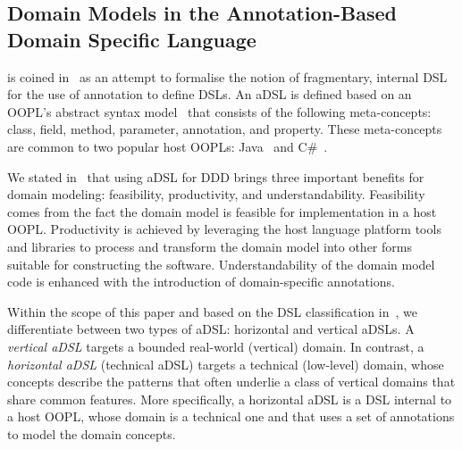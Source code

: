 \subsection{Domain Models in the Annotation-Based Domain Specific Language \dcsl}
\label{sect:bg-dcsl}

 is coined in~\cite{nosal_language_2016} as an attempt to formalise the notion of fragmentary, internal DSL~\cite{fowler_domain-specific_2010} for the use of annotation to define DSLs. An aDSL is defined based on an OOPL's abstract syntax model~\cite{le_domain_2018} that consists of the following meta-concepts: class, field, method, parameter, annotation, and property. These meta-concepts are common to two popular host OOPLs: Java~\cite{gosling_java_2014} and C\#~\cite{hejlsberg_c_2010}.

%
We stated in~\cite{le_domain_2018} that using aDSL for DDD brings three important benefits for domain modeling: feasibility, productivity, and understandability. Feasibility comes from the fact the domain model is feasible for implementation in a host OOPL. Productivity is achieved by leveraging the host language platform tools and libraries to process and transform the domain model into other forms suitable for constructing the software. Understandability of the domain model code is enhanced with the introduction of domain-specific annotations.

Within the scope of this paper and based on the DSL classification in~\cite{kleppe_software_2008}, we differentiate between two types of aDSL: horizontal and vertical aDSLs.
A \textit{vertical aDSL} targets a bounded real-world (vertical) domain. In contrast, a \textit{horizontal aDSL} (\aka technical aDSL) targets a technical (low-level) domain, whose concepts describe the patterns that often underlie a class of vertical domains that share common features. 
More specifically, a horizontal aDSL is a DSL internal to a host OOPL, whose domain is a technical one and that uses a set of annotations to model the domain concepts.


